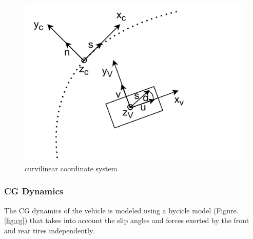 \documentclass[conference,11pt]{IEEEtran}
\begin{document}
\begin{figure}[t]
  \centering
  \includegraphics{curvilinear2.pdf}
  \caption{curvilinear coordinate system}
  \label{fig:curv}
\end{figure}
\subsubsection{CG Dynamics}
The CG dynamics of the vehicle is modeled using a bycicle model (Figure. \ref{fig:cg}) that takes into account the slip angles and forces exerted by the front and rear tires independently.
\end{document}
